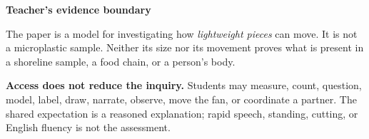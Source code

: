 \documentclass[10pt,letterpaper]{article}
\begin{document}
\begin{minipage}[t]{0.48\linewidth}
\vspace{0pt}\textbf{Teacher's evidence boundary}\par\vspace{0.04in}
The paper is a model for investigating how \emph{lightweight pieces} can move. It is not a microplastic sample. Neither its size nor its movement proves what is present in a shoreline sample, a food chain, or a person's body.
\end{minipage}\par
\begin{notebox}
\textbf{Access does not reduce the inquiry.} Students may measure, count, question, model, label, draw, narrate, observe, move the fan, or coordinate a partner. The shared expectation is a reasoned explanation; rapid speech, standing, cutting, or English fluency is not the assessment.
\end{notebox}
\newpage
\end{document}
